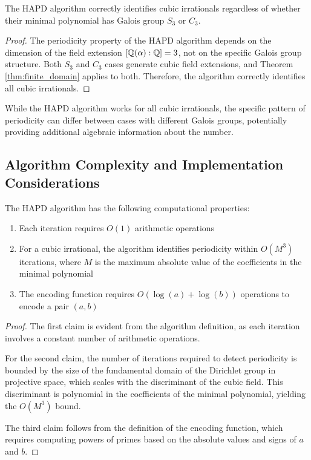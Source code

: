 \begin{proposition}\label{prop:galois_behavior}
The HAPD algorithm correctly identifies cubic irrationals regardless of whether their minimal polynomial has Galois group $S_3$ or $C_3$.
\end{proposition}

\begin{proof}
The periodicity property of the HAPD algorithm depends on the dimension of the field extension $[\mathbb{Q}(\alpha):\mathbb{Q}] = 3$, not on the specific Galois group structure. Both $S_3$ and $C_3$ cases generate cubic field extensions, and Theorem \ref{thm:finite_domain} applies to both. Therefore, the algorithm correctly identifies all cubic irrationals.
\end{proof}

\begin{remark}
While the HAPD algorithm works for all cubic irrationals, the specific pattern of periodicity can differ between cases with different Galois groups, potentially providing additional algebraic information about the number.
\end{remark}

\subsection{Algorithm Complexity and Implementation Considerations}

\begin{proposition}\label{prop:complexity}
The HAPD algorithm has the following computational properties:
\begin{enumerate}
    \item Each iteration requires $O(1)$ arithmetic operations
    \item For a cubic irrational, the algorithm identifies periodicity within $O(M^3)$ iterations, where $M$ is the maximum absolute value of the coefficients in the minimal polynomial
    \item The encoding function requires $O(\log(a) + \log(b))$ operations to encode a pair $(a, b)$
\end{enumerate}
\end{proposition}

\begin{proof}
The first claim is evident from the algorithm definition, as each iteration involves a constant number of arithmetic operations.

For the second claim, the number of iterations required to detect periodicity is bounded by the size of the fundamental domain of the Dirichlet group in projective space, which scales with the discriminant of the cubic field. This discriminant is polynomial in the coefficients of the minimal polynomial, yielding the $O(M^3)$ bound.

The third claim follows from the definition of the encoding function, which requires computing powers of primes based on the absolute values and signs of $a$ and $b$.
\end{proof}

